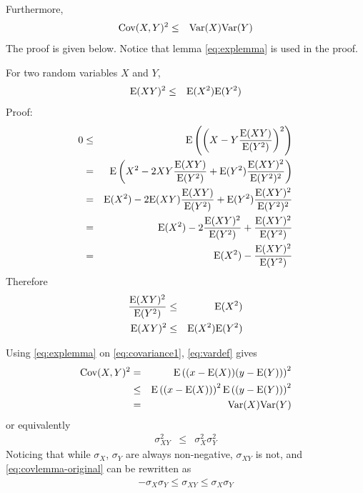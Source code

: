 Furthermore,
\begin{eqnarray}
	\textup{Cov}(X, Y)^2 &\leq& \textup{Var}(X)\textup{Var}(Y) \nonumber
\end{eqnarray}
The proof is given below. Notice that lemma \eqref{eq:explemma} is used in the proof.
\begin{mdframed}[frametitle={Lemma}]
	
	For two random variables $X$ and $Y$,
	\begin{eqnarray}
		\textup{E}(XY)^2 &\leq&  \textup{E}(X^2)\textup{E}(Y^2) \label{eq:explemma}
	\end{eqnarray}
	\noindent Proof:
	\begin{eqnarray}
		0 &\leq& \textup{E}\left(\left(X-Y\dfrac{\textup{E}(XY)}{\textup{E}(Y^2)}\right)^2\right) \nonumber \\
		&=& \textup{E}\left(X^2-2XY\dfrac{\textup{E}(XY)}{\textup{E}(Y^2)}+\textup{E}(Y^2)\dfrac{\textup{E}(XY)^2}{\textup{E}(Y^2)^2}\right) \nonumber \\
		&=& \textup{E}(X^2) - 2\textup{E}(XY)\dfrac{\textup{E}(XY)}{\textup{E}(Y^2)} + \textup{E}(Y^2)\dfrac{\textup{E}(XY)^2}{\textup{E}(Y^2)^2} \nonumber \\
		&=& \textup{E}(X^2) - 2\dfrac{\textup{E}(XY)^2}{\textup{E}(Y^2)} + \dfrac{\textup{E}(XY)^2}{\textup{E}(Y^2)} \nonumber \\
		&=& \textup{E}(X^2) - \dfrac{\textup{E}(XY)^2}{\textup{E}(Y^2)} \nonumber
	\end{eqnarray}
	Therefore
	\begin{eqnarray}
		\dfrac{\textup{E}(XY)^2}{\textup{E}(Y^2)} &\leq& \textup{E}(X^2) \nonumber \\
		\textup{E}(XY)^2 &\leq&  \textup{E}(X^2)\textup{E}(Y^2) \nonumber
	\end{eqnarray}
\end{mdframed}
Using \eqref{eq:explemma} on \eqref{eq:covariance1}, \eqref{eq:vardef} gives
\begin{eqnarray}
	\textup{Cov}(X, Y)^2 &=& \textup{E}\left((x - \textup{E}(X))(y - \textup{E}(Y))\right)^2 \nonumber \\
	&\leq& \textup{E}\left((x - \textup{E}(X))\right)^2\textup{E}\left((y - \textup{E}(Y))\right)^2 \nonumber \\
	&=& \textup{Var}(X)\textup{Var}(Y) \nonumber
\end{eqnarray}
or equivalently
\begin{eqnarray}
	\sigma_{XY}^2 &\leq& \sigma_X^2\sigma_Y^2 \label{eq:covlemma-original}
\end{eqnarray}
Noticing that while $\sigma_X$, $\sigma_Y$ are always non-negative, $\sigma_{XY}$ is not, and \eqref{eq:covlemma-original} can be rewritten as
\begin{eqnarray}
	-\sigma_X\sigma_Y \leq \sigma_{XY} \leq \sigma_X\sigma_Y \label{eq:covlemma}
\end{eqnarray}

